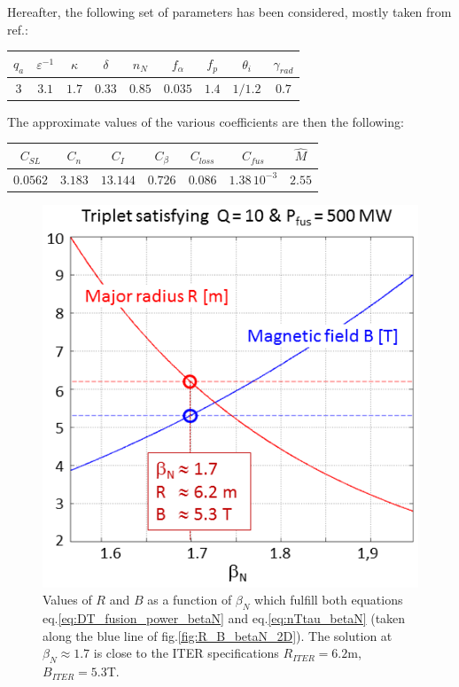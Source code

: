 Hereafter, the following set of parameters has been considered, mostly taken from ref.\cite{Johner2011}:
\begin{center}
	\begin{tabular}{c|c|c|c|c|c|c|c|c}
		\hline
		$q_a$ & $\varepsilon^{-1}$ & $\kappa$ & $\delta$ & $n_N$ & $f_\alpha$ & $f_p$ & $\theta_i$ & $\gamma_{rad}$ \\
		\hline
		$3$   & $3.1$ & $1.7$ & $0.33$ & $0.85$ & $0.035$ & $1.4$ & $1/1.2$ & $0.7$ \\
		\hline	
	\end{tabular}
\end{center}
The approximate values of the various coefficients are then the following:
\begin{center}
	\begin{tabular}{c|c|c|c|c|c|c}
		\hline
		$C_{SL}$ & $C_n$ & $C_I$ & $C_\beta$ & $C_{loss}$ & $C_{fus}$ & $\hat M$ \\
		\hline
		$0.0562$ & $3.183$ & $13.144$ & $0.726$ & $0.086$ & $1.38\,10^{-3}$ & $2.55$ \\
		\hline	
	\end{tabular}
\end{center}
\bigskip

\begin{figure} 
	\centering
	\includegraphics[width=.8\textwidth]{figures/Fig_R_B_betaN_solutions_v3.png}
	\caption{Values of $R$ and $B$ as a function of $\beta_N$ which fulfill both equations eq.\ref{eq:DT_fusion_power_betaN} and eq.\ref{eq:nTtau_betaN} (taken along the blue line of fig.\ref{fig:R_B_betaN_2D}). The solution at $\beta_N \approx 1.7$ is close to the ITER specifications $R_{ITER}=6.2$m, $B_{ITER}=5.3$T.}
	\label{fig:solutions_betaN}
\end{figure}



